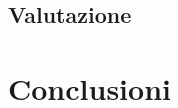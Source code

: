 \documentclass{beamer}
\begin{document}
\subsection{Valutazione}




\section{Conclusioni}




\appendix
\makethanks
\renewcommand{\turnOffNumbers}{true} %



\end{document}
